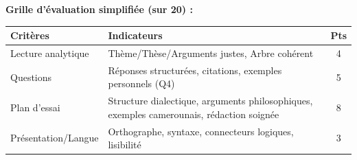 \documentclass[11pt]{article}
\begin{document}
\textbf{Grille d'évaluation simplifiée (sur 20) :}
\begin{center}
\begin{tabularx}{\linewidth}{|l|X|c|}\hline
\textbf{Critères} & \textbf{Indicateurs} & \textbf{Pts} \\ \hline
Lecture analytique & Thème/Thèse/Arguments justes, Arbre cohérent & 4 \\ \hline
Questions & Réponses structurées, citations, exemples personnels (Q4) & 5 \\ \hline
Plan d'essai & Structure dialectique, arguments philosophiques, exemples camerounais, rédaction soignée & 8 \\ \hline
Présentation/Langue & Orthographe, syntaxe, connecteurs logiques, lisibilité & 3 \\ \hline
\end{tabularx}
\end{center}
\end{document}
